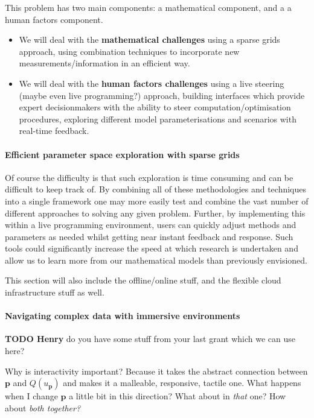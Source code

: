 \documentclass[a4paper,fontsize=12pt]{scrartcl}
\begin{document}
This problem has two main components: a mathematical component, and a
a human factors component.
\begin{itemize}
\item We will deal with the \textbf{mathematical challenges} using a
  sparse grids approach, using combination techniques
  to incorporate new measurements/information in an efficient way.
\item We will deal with the \textbf{human factors challenges} using a
  live steering (maybe even live programming?) approach, building
  interfaces which provide expert decisionmakers with the ability to
  steer computation/optimisation procedures, exploring different model
  parameterisations and scenarios with real-time feedback.
\end{itemize}





\paragraph{Efficient parameter space exploration with sparse grids}

Of course the difficulty is that such exploration is time consuming
and can be difficult to keep track of. By combining all of these
methodologies and techniques into a single framework one may more
easily test and combine the vast number of different approaches to
solving any given problem. Further, by implementing this within a live
programming environment, users can quickly adjust methods and
parameters as needed whilst getting near instant feedback and
response. Such tools could significantly increase the speed at which
research is undertaken and allow us to learn more from our
mathematical models than previously envisioned.

This section will also include the offline/online stuff, and the
flexible cloud infrastructure stuff as well.

\paragraph{Navigating complex data with immersive environments}

\noindent
\textbf{TODO Henry} do you have some stuff from your last grant which
we can use here?

Why is interactivity important? Because it takes the abstract
connection between $\mathbf{p}$ and $Q(u_{\mathbf{p}})$ and makes it a malleable,
responsive, tactile one. What happens when I change $\mathbf{p}$ a little bit
in this direction? What about in \emph{that} one? How about \emph{both
  together?}
\end{document}
